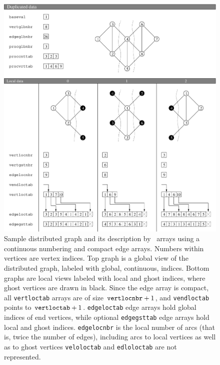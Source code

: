 \begin{figure}
\centering\includegraphics[scale=0.47]{p_f_gr1.eps}
\caption{Sample distributed graph and its description by
\libscotch\ arrays using a continuous numbering and compact edge
arrays. Numbers within vertices are vertex indices. Top graph is a
global view of the distributed graph, labeled with global, continuous,
indices. Bottom graphs are local views labeled with local and ghost
indices, where ghost vertices are drawn in black.  Since the edge
array is compact, all {\tt vertloctab} arrays are of size $\mbox{\tt
vertlocnbr} + 1$, and {\tt vendloctab} points to $\mbox{\tt
vertloctab} + 1$. {\tt edgeloctab} edge arrays hold global indices
of end vertices, while optional {\tt edgegsttab} edge arrays hold
local and ghost indices. {\tt edgelocnbr} is the local number of arcs
(that is, twice the number of edges), including arcs to local vertices
as well as to ghost vertices {\tt veloloctab} and {\tt edloloctab} are
not represented.}
\label{fig-lib-dgraf-one}
\end{figure}

